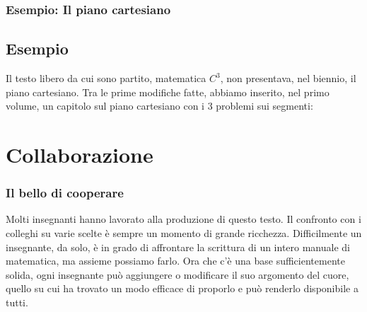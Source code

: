 \documentclass{beamer} %
\begin{document}
\begin{frame}\frametitle{Esempio: Il piano cartesiano}

\subsection{Esempio} Il testo libero da cui sono partito, matematica \(C^3\), 
non presentava, nel biennio, il piano cartesiano. 
Tra le prime modifiche fatte, abbiamo inserito, nel primo volume, un 
capitolo sul piano cartesiano con i 3 problemi sui segmenti:

\end{frame}


\section{Collaborazione}

\begin{frame}\frametitle{Il bello di cooperare}

Molti insegnanti hanno lavorato alla produzione di questo testo.
\spause
Il confronto con i colleghi su varie scelte è sempre un momento di grande 
ricchezza.
\spause
Difficilmente un insegnante, da solo, è in grado di affrontare la scrittura 
di un intero manuale di matematica, ma assieme possiamo farlo.
\spause
Ora che c'è una base sufficientemente solida, ogni insegnante 
può aggiungere o modificare il suo argomento del cuore, quello su cui ha 
trovato un modo efficace di proporlo e può renderlo disponibile a tutti.

\end{frame}
\end{document}
